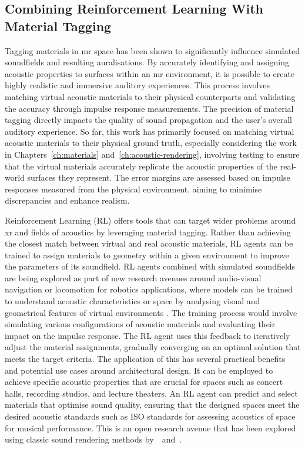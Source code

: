 \subsection{Combining Reinforcement Learning With Material Tagging}
Tagging materials in \acrshort{mr} space has been shown to significantly influence simulated soundfields and resulting auralisations. By accurately identifying and assigning acoustic properties to surfaces within an \acrshort{mr} environment, it is possible to create highly realistic and immersive auditory experiences. This process involves matching virtual acoustic materials to their physical counterparts and validating the accuracy through impulse response measurements. The precision of material tagging directly impacts the quality of sound propagation and the user's overall auditory experience.
So far, this work has primarily focused on matching virtual acoustic materials to their physical ground truth, especially considering the work in Chapters~\ref{ch:materials} and~\ref{ch:acoustic-rendering}, involving testing to ensure that the virtual materials accurately replicate the acoustic properties of the real-world surfaces they represent. The error margins are assessed based on impulse responses measured from the physical environment, aiming to minimise discrepancies and enhance realism.\par
Reinforcement Learning (RL) offers tools that can target wider problems around \acrshort{xr} and fields of acoustics by leveraging material tagging. Rather than achieving the closest match between virtual and real acoustic materials, RL agents can be trained to assign materials to geometry within a given environment to improve the parameters of its soundfield. RL agents combined with simulated soundfields are being explored as part of new research avenues around audio-visual navigation or locomotion for robotics applications, where models can be trained to understand acoustic characteristics or space by analysing visual and geometrical features of virtual environments \citep{chen2021semantic, gan2020look}.
The training process would involve simulating various configurations of acoustic materials and evaluating their impact on the impulse response. The RL agent uses this feedback to iteratively adjust the material assignments, gradually converging on an optimal solution that meets the target criteria.
The application of this has several practical benefits and potential use cases around architectural design. It can be employed to  achieve specific acoustic properties that are crucial for spaces such as concert halls, recording studios, and lecture theaters. An RL agent can predict and select materials that optimise sound quality, ensuring that the designed spaces meet the desired acoustic standards such as ISO standards for assessing acoustics of space for musical performance. This is an open research avenue that has been explored using classic sound rendering methods by~\cite{funkhouser2004beam}~and~\cite{heimes2019real}.


